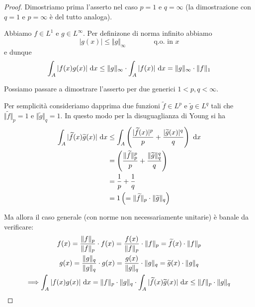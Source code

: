 \begin{proof}
Dimostriamo prima l'asserto nel caso $p=1$ e $q=\infty$ (la dimostrazione con $q=1$ e $p=\infty$ è del tutto analoga).

Abbiamo $f\in L^1$ e $g\in L^{\infty}$. Per definizone di norma infinito abbiamo 
$$
|g(x)| \leq \Vert g \Vert_{\infty} \qquad\qquad\text{q.o. in }x
$$
e dunque
$$
\int_A |f(x) g(x)| \  \mathrm{d} x \leq \Vert g \Vert_{\infty}\cdot \int_A |f(x)| \  \mathrm{d} x = \Vert g \Vert_{\infty}\cdot \Vert f \Vert_{1}
$$

Possiamo passare a dimostrare l'asserto per due generici $1<p,q<\infty$. 

Per semplicità consideriamo dapprima due funzioni $\widetilde{f}\in L^p$ e $\widetilde{g}\in L^q$ tali che $\Vert \widetilde{f}\Vert_p=1$ e $\Vert \widetilde{g}\Vert_q=1$. In questo modo per la disuguaglianza di Young si ha
\begin{align*}
\int_A | \widetilde{f}(x) \widetilde{g}(x)| \  \mathrm{d} x&\leq \int_A \left(\frac{|\widetilde{f}(x)|^p}{p}+\frac{|\widetilde{g}(x)|^q}{q} \right)\  \mathrm{d} x \\
&=\left(\frac{\Vert \widetilde{f}\Vert_p^p}{p}+\frac{\Vert \widetilde{g}\Vert_q^q}{q}\right) \\
&=\frac{1}{p}+\frac{1}{q} \\
&=1\left(=\Vert \widetilde{f}\Vert_p\cdot \Vert \widetilde{g}\Vert_q\right)
\end{align*} 

Ma allora il caso generale (con norme non necessariamente unitarie) è banale da verificare:
\begin{gather*}
f(x)=\frac{\Vert f \Vert_{p}}{\Vert f \Vert_{p}} \cdot f(x)=\frac{f(x)}{\Vert f \Vert_{p}} \cdot \Vert f \Vert_{p} = \widetilde{f}(x)\cdot \Vert f \Vert_{p} \\
g(x)=\frac{\Vert g \Vert_{q}}{\Vert g \Vert_{q}} \cdot g(x)=\frac{g(x)}{\Vert g \Vert_{q}} \cdot \Vert g \Vert_{q} = \widetilde{g}(x)\cdot \Vert g \Vert_{q} \\
\Longrightarrow \int_A | f(x) g(x)| \  \mathrm{d} x =\Vert f \Vert_{p}\cdot \Vert g \Vert_{q} \cdot \int_A | \widetilde{f}(x) \widetilde{g}(x)| \  \mathrm{d} x \leq \Vert f \Vert_{p}\cdot \Vert g \Vert_{q}
\end{gather*}
\end{proof}

